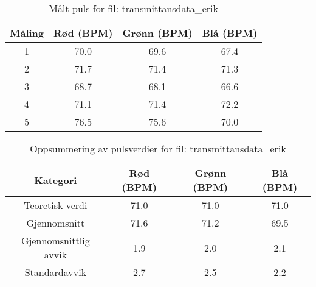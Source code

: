 
\begin{table}[H]
\centering
\caption{Målt puls for fil: transmittansdata\_erik}
\label{tab:transmittansdata\_erik}
\begin{tabular}{|c|c|c|c|}
\hline
\textbf{Måling} & \textbf{Rød (BPM)} & \textbf{Grønn (BPM)} & \textbf{Blå (BPM)} \\ \hline
1 & 70.0 & 69.6 & 67.4 \\ \hline
2 & 71.7 & 71.4 & 71.3 \\ \hline
3 & 68.7 & 68.1 & 66.6 \\ \hline
4 & 71.1 & 71.4 & 72.2 \\ \hline
5 & 76.5 & 75.6 & 70.0 \\ \hline
\end{tabular}
\end{table}

\begin{table}[H]
\centering
\caption{Oppsummering av pulsverdier for fil: transmittansdata\_erik}
\label{tab:transmittansdata\_erik_summary}
\begin{tabular}{|c|c|c|c|}
\hline
\textbf{Kategori} & \textbf{Rød (BPM)} & \textbf{Grønn (BPM)} & \textbf{Blå (BPM)} \\ \hline
Teoretisk verdi & 71.0 & 71.0 & 71.0 \\ \hline
Gjennomsnitt & 71.6 & 71.2 & 69.5 \\ \hline
Gjennomsnittlig avvik & 1.9 & 2.0 & 2.1 \\ \hline
Standardavvik & 2.7 & 2.5 & 2.2 \\ \hline
\end{tabular}
\end{table}